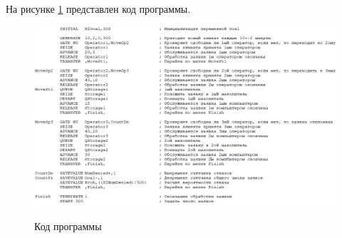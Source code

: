 На рисунке \ref{fig4:image} представлен код программы.

\begin{figure}[h]
	\begin{center}
		{\includegraphics[scale = 0.57]{img/code.png}}
		\caption{Код программы}
		\label{fig4:image}
	\end{center}
\end{figure}